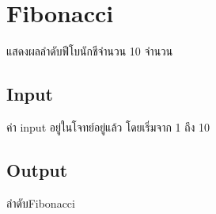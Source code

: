 \documentclass{article}
\begin{document}
\section*{Fibonacci}

แสดงผลลำดับฟีโบนักชีจำนวน 10 จำนวน\\



\subsection*{Input}
ค่า input อยู่ในโจทย์อยู่แล้ว โดยเริ่มจาก 1 ถึง 10



\subsection*{Output}
ลำดับFibonacci
\end{document}
